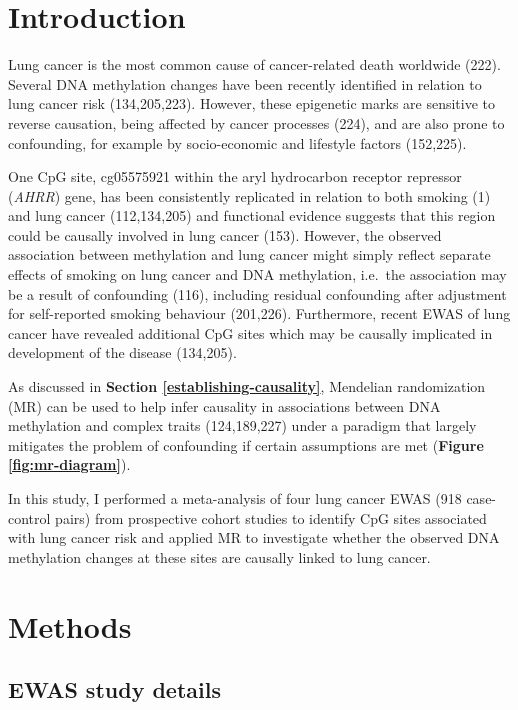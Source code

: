 \documentclass[11pt,oneside]{bristolthesis}
\begin{document}
\hypertarget{introduction-07}{%
\section{Introduction}\label{introduction-07}}

Lung cancer is the most common cause of cancer-related death worldwide (222). Several DNA methylation changes have been recently identified in relation to lung cancer risk (134,205,223). However, these epigenetic marks are sensitive to reverse causation, being affected by cancer processes (224), and are also prone to confounding, for example by socio-economic and lifestyle factors (152,225).

One CpG site, cg05575921 within the aryl hydrocarbon receptor repressor (\emph{AHRR}) gene, has been consistently replicated in relation to both smoking (1) and lung cancer (112,134,205) and functional evidence suggests that this region could be causally involved in lung cancer (153). However, the observed association between methylation and lung cancer might simply reflect separate effects of smoking on lung cancer and DNA methylation, i.e.~the association may be a result of confounding (116), including residual confounding after adjustment for self-reported smoking behaviour (201,226). Furthermore, recent EWAS of lung cancer have revealed additional CpG sites which may be causally implicated in development of the disease (134,205).

As discussed in \textbf{Section \ref{establishing-causality}}, Mendelian randomization (MR) can be used to help infer causality in associations between DNA methylation and complex traits (124,189,227) under a paradigm that largely mitigates the problem of confounding if certain assumptions are met (\textbf{Figure \ref{fig:mr-diagram}}).

In this study, I performed a meta-analysis of four lung cancer EWAS (918 case-control pairs) from prospective cohort studies to identify CpG sites associated with lung cancer risk and applied MR to investigate whether the observed DNA methylation changes at these sites are causally linked to lung cancer.

\hypertarget{methods-07}{%
\section{Methods}\label{methods-07}}

\hypertarget{ewas-study-details}{%
\subsection{EWAS study details}\label{ewas-study-details}}
\end{document}
